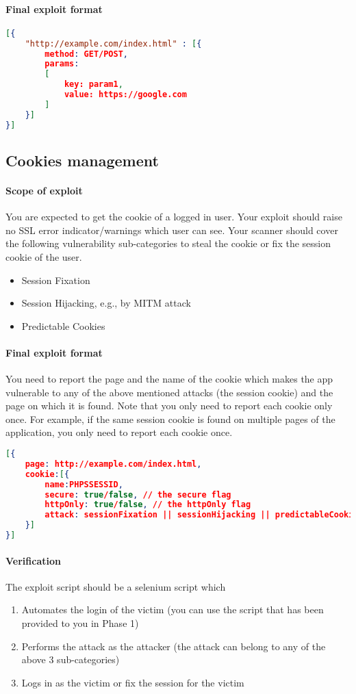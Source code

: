 \documentclass{article}[10pt]
\begin{document}
\paragraph{Final exploit format\\} 
\begin{lstlisting}[language=json,firstnumber=1]
[{	
	"http://example.com/index.html" : [{
		method: GET/POST,
		params: 
		[
			key: param1,
			value: https://google.com
		]
	}]
}]
\end{lstlisting}

\subsection{Cookies management}
\paragraph{Scope of exploit}
You are expected to get the cookie of a logged in user. Your exploit should raise no SSL error indicator/warnings which user can see. Your scanner should cover the following vulnerability sub-categories to steal the cookie or fix the session cookie of the user. 
	\begin{itemize}
		\item Session Fixation
		\item Session Hijacking, e.g., by MITM attack
		\item Predictable Cookies
	\end{itemize}

\paragraph{Final exploit format}
You need to report the page and the name of the cookie which makes the app vulnerable to any of the above mentioned attacks (the session cookie) and the page on which it is found. Note that you only need to report each cookie only once. For example, if the same session cookie is found on multiple pages of the application, you only need to report each cookie once. 

\begin{lstlisting}[language=json,firstnumber=1]
[{
	page: http://example.com/index.html,
	cookie:[{
		name:PHPSSESSID,
		secure: true/false, // the secure flag
		httpOnly: true/false, // the httpOnly flag
		attack: sessionFixation || sessionHijacking || predictableCookies
	}]
}]
\end{lstlisting}

\paragraph{Verification}
The exploit script should be a selenium script which
\begin{enumerate}
\item Automates the login of the victim (you can use the script that has been provided to you in Phase 1)
\item Performs the attack as the attacker (the attack can belong to any of the above 3 sub-categories)
\item Logs in as the victim or fix the session for the victim
\end{enumerate}
\end{document}
